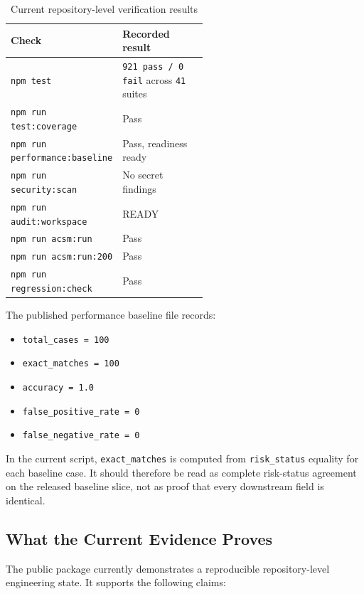 \documentclass[11pt,a4paper]{article}
\begin{document}
\begin{table}[H]
\centering
\caption{Current repository-level verification results}
\begin{tabularx}{\linewidth}{>{\raggedright\arraybackslash}p{0.55\linewidth} >{\raggedright\arraybackslash}X}
\toprule
\textbf{Check} & \textbf{Recorded result} \\
\midrule
\texttt{npm test} & \texttt{921 pass / 0 fail} across \texttt{41} suites \\
\texttt{npm run test:coverage} & Pass \\
\texttt{npm run performance:baseline} & Pass, readiness ready \\
\texttt{npm run security:scan} & No secret findings \\
\texttt{npm run audit:workspace} & READY \\
\texttt{npm run acsm:run} & Pass \\
\texttt{npm run acsm:run:200} & Pass \\
\texttt{npm run regression:check} & Pass \\
\bottomrule
\end{tabularx}
\end{table}

The published performance baseline file records:

\begin{itemize}[leftmargin=1.8em]
\item \texttt{total\_cases = 100}
\item \texttt{exact\_matches = 100}
\item \texttt{accuracy = 1.0}
\item \texttt{false\_positive\_rate = 0}
\item \texttt{false\_negative\_rate = 0}
\end{itemize}

In the current script, \texttt{exact\_matches} is computed from \texttt{risk\_status} equality for each baseline case. It should therefore be read as complete risk-status agreement on the released baseline slice, not as proof that every downstream field is identical.

\subsection{What the Current Evidence Proves}

The public package currently demonstrates a reproducible repository-level engineering state. It supports the following claims:
\end{document}
